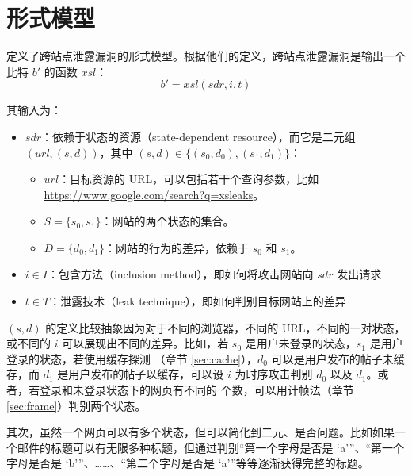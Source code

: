 \section{形式模型}

\citeauthor{modelbase} \cite{modelbase} 定义了跨站点泄露漏洞的形式模型。根据他们的定义，跨站点泄露漏洞是输出一个比特 $b'$ 的函数 $xsl$：
$$b'=xsl(sdr, i, t)$$

其输入为：

\begin{itemize}
    \item $sdr$：依赖于状态的资源（state-dependent resource），而它是二元组 $(url, (s, d))$，其中 $(s, d)\in\{(s_0, d_0), (s_1, d_1)\}$：
    \begin{itemize}
        \item $url$：目标资源的 URL，可以包括若干个查询参数，比如 \url{https://www.google.com/search?q=xsleaks}。
        \item $S=\{s_0, s_1\}$：网站的两个状态的集合。
        \item $D=\{d_0, d_1\}$：网站的行为的差异，依赖于 $s_0$ 和 $s_1$。
    \end{itemize}
    \item $i\in I$：包含方法（inclusion method），即如何将攻击网站向 $sdr$ 发出请求
    \item $t\in T$：泄露技术（leak technique），即如何判别目标网站上的差异
\end{itemize}

$(s,d)$ 的定义比较抽象因为对于不同的浏览器，不同的 URL，不同的一对状态，或不同的 $i$ 可以展现出不同的差异。比如，若 $s_0$ 是用户未登录的状态，$s_1$ 是用户登录的状态，若使用缓存探测 （章节 \ref{sec:cache}），$d_0$ 可以是用户发布的帖子未缓存，而 $d_1$ 是用户发布的帖子以缓存，可以设 $i$ 为时序攻击判别 $d_0$ 以及 $d_1$。或者，若登录和未登录状态下的网页有不同的  个数，可以用计帧法（章节 \ref{sec:frame}）判别两个状态。

其次，虽然一个网页可以有多个状态，但可以简化到二元、是否问题。比如如果一个邮件的标题可以有无限多种标题，但通过判别“第一个字母是否是 ‘a’”、“第一个字母是否是 ‘b’”、……、“第二个字母是否是 ‘a’”等等逐渐获得完整的标题。